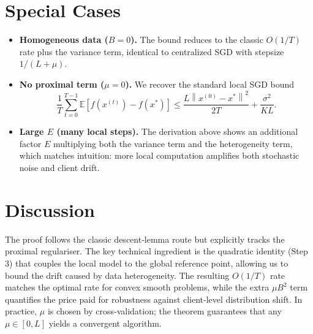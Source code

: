 \documentclass{article}
\newcommand{\E}{\mathbb{E}}
\newcommand{\norm}[1]{\left\lVert#1\right\rVert}
\begin{document}
\section*{Special Cases}
\begin{itemize}
    \item \textbf{Homogeneous data ($B=0$).} The bound reduces to the classic $O(1/T)$ rate plus the variance term, identical to centralized SGD with stepsize $1/(L+\mu)$.
    \item \textbf{No proximal term ($\mu=0$).} We recover the standard local SGD bound
    \[
    \frac{1}{T}\sum_{t=0}^{T-1}\E[f(x^{(t)})-f(x^{*})]\le
    \frac{L\norm{x^{(0)}-x^{*}}^{2}}{2T}
    +\frac{\sigma^{2}}{KL}.
    \]
    \item \textbf{Large $E$ (many local steps).} The derivation above shows an additional factor $E$ multiplying both the variance term and the heterogeneity term, which matches intuition: more local computation amplifies both stochastic noise and client drift.
\end{itemize}

\section*{Discussion}
The proof follows the classic descent‑lemma route but explicitly tracks the proximal regulariser. The key technical ingredient is the quadratic identity (Step 3) that couples the local model to the global reference point, allowing us to bound the drift caused by data heterogeneity. The resulting $O(1/T)$ rate matches the optimal rate for convex smooth problems, while the extra $\mu B^{2}$ term quantifies the price paid for robustness against client‑level distribution shift. In practice, $\mu$ is chosen by cross‑validation; the theorem guarantees that any $\mu\in[0,L]$ yields a convergent algorithm.
\end{document}

